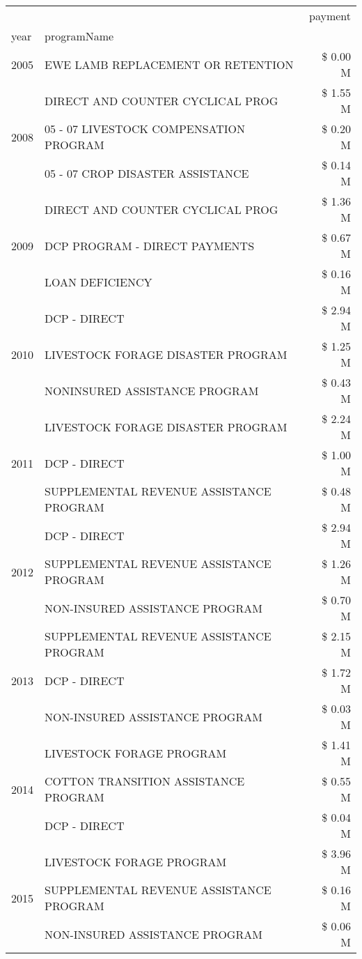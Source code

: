 \begin{tabular}{llr}
\toprule
 &  & payment \\
year & programName &  \\
\midrule
2005 & EWE LAMB REPLACEMENT OR RETENTION & \$ 0.00 M \\
\cline{1-3}
\multirow[t]{3}{*}{2008} & DIRECT AND COUNTER CYCLICAL PROG & \$ 1.55 M \\
 & 05 - 07 LIVESTOCK COMPENSATION PROGRAM & \$ 0.20 M \\
 & 05 - 07 CROP DISASTER ASSISTANCE & \$ 0.14 M \\
\cline{1-3}
\multirow[t]{3}{*}{2009} & DIRECT AND COUNTER CYCLICAL PROG & \$ 1.36 M \\
 & DCP PROGRAM - DIRECT PAYMENTS & \$ 0.67 M \\
 & LOAN DEFICIENCY & \$ 0.16 M \\
\cline{1-3}
\multirow[t]{3}{*}{2010} & DCP - DIRECT & \$ 2.94 M \\
 & LIVESTOCK FORAGE DISASTER PROGRAM & \$ 1.25 M \\
 & NONINSURED ASSISTANCE PROGRAM & \$ 0.43 M \\
\cline{1-3}
\multirow[t]{3}{*}{2011} & LIVESTOCK FORAGE DISASTER PROGRAM & \$ 2.24 M \\
 & DCP - DIRECT & \$ 1.00 M \\
 & SUPPLEMENTAL REVENUE ASSISTANCE PROGRAM & \$ 0.48 M \\
\cline{1-3}
\multirow[t]{3}{*}{2012} & DCP - DIRECT & \$ 2.94 M \\
 & SUPPLEMENTAL REVENUE ASSISTANCE PROGRAM & \$ 1.26 M \\
 & NON-INSURED ASSISTANCE PROGRAM & \$ 0.70 M \\
\cline{1-3}
\multirow[t]{3}{*}{2013} & SUPPLEMENTAL REVENUE ASSISTANCE PROGRAM & \$ 2.15 M \\
 & DCP - DIRECT & \$ 1.72 M \\
 & NON-INSURED ASSISTANCE PROGRAM & \$ 0.03 M \\
\cline{1-3}
\multirow[t]{3}{*}{2014} & LIVESTOCK FORAGE PROGRAM & \$ 1.41 M \\
 & COTTON TRANSITION ASSISTANCE PROGRAM & \$ 0.55 M \\
 & DCP - DIRECT & \$ 0.04 M \\
\cline{1-3}
\multirow[t]{3}{*}{2015} & LIVESTOCK FORAGE PROGRAM & \$ 3.96 M \\
 & SUPPLEMENTAL REVENUE ASSISTANCE PROGRAM & \$ 0.16 M \\
 & NON-INSURED ASSISTANCE PROGRAM & \$ 0.06 M \\

\end{tabular}
